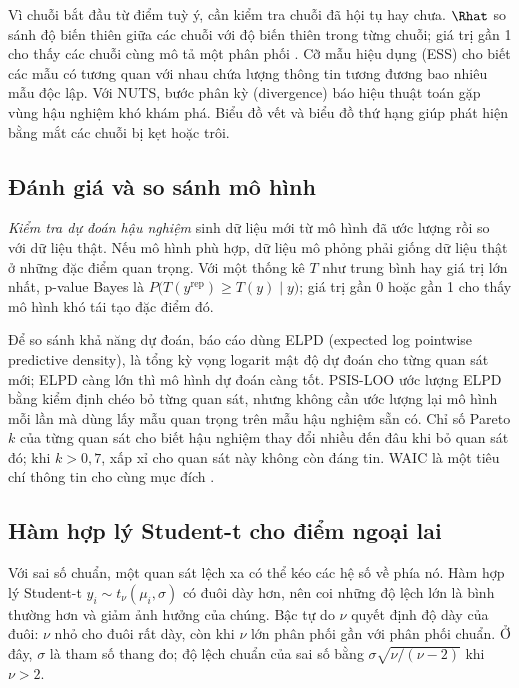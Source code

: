 \documentclass[12pt,a4paper]{report}
\begin{document}
Vì chuỗi bắt đầu từ điểm tuỳ ý, cần kiểm tra chuỗi đã hội tụ hay chưa. $\Rhat$
so sánh độ biến thiên giữa các chuỗi với độ biến thiên trong từng chuỗi; giá trị
gần 1 cho thấy các chuỗi cùng mô tả một phân phối \cite{vehtari2021rhat}. Cỡ mẫu
hiệu dụng (ESS) cho biết các mẫu có tương quan với nhau chứa lượng thông tin
tương đương bao nhiêu mẫu độc lập. Với NUTS, bước phân kỳ (divergence) báo hiệu
thuật toán gặp vùng hậu nghiệm khó khám phá. Biểu đồ vết và biểu đồ thứ hạng
giúp phát hiện bằng mắt các chuỗi bị kẹt hoặc trôi.

\subsection{Đánh giá và so sánh mô hình}

\emph{Kiểm tra dự đoán hậu nghiệm} sinh dữ liệu mới từ mô hình đã ước lượng rồi
so với dữ liệu thật. Nếu mô hình phù hợp, dữ liệu mô phỏng phải giống dữ liệu
thật ở những đặc điểm quan trọng. Với một thống kê $T$ như trung bình hay giá trị
lớn nhất, p-value Bayes là $P\bigl(T(y^{\text{rep}}) \ge T(y) \mid y\bigr)$;
giá trị gần 0 hoặc gần 1 cho thấy mô hình khó tái tạo đặc điểm đó.

Để so sánh khả năng dự đoán, báo cáo dùng ELPD (expected log pointwise
predictive density), là tổng kỳ vọng logarit mật độ dự đoán cho từng quan sát
mới; ELPD càng lớn thì mô hình dự đoán càng tốt. PSIS-LOO ước lượng ELPD bằng
kiểm định chéo bỏ từng quan sát, nhưng không cần ước lượng lại mô hình mỗi lần
mà dùng lấy mẫu quan trọng trên mẫu hậu nghiệm sẵn có. Chỉ số Pareto $k$ của
từng quan sát cho biết hậu nghiệm thay đổi nhiều đến đâu khi bỏ quan sát đó;
khi $k > 0{,}7$, xấp xỉ cho quan sát này không còn đáng tin. WAIC là một tiêu
chí thông tin cho cùng mục đích \cite{vehtari2017loo}.

\subsection{Hàm hợp lý Student-t cho điểm ngoại lai}

Với sai số chuẩn, một quan sát lệch xa có thể kéo các hệ số về phía nó. Hàm hợp
lý Student-t $y_i \sim t_\nu(\mu_i, \sigma)$ có đuôi dày hơn, nên coi những độ
lệch lớn là bình thường hơn và giảm ảnh hưởng của chúng. Bậc tự do $\nu$ quyết
định độ dày của đuôi: $\nu$ nhỏ cho đuôi rất dày, còn khi $\nu$ lớn phân phối
gần với phân phối chuẩn. Ở đây, $\sigma$ là tham số thang đo; độ lệch chuẩn của
sai số bằng $\sigma\sqrt{\nu/(\nu-2)}$ khi $\nu > 2$.
\end{document}
